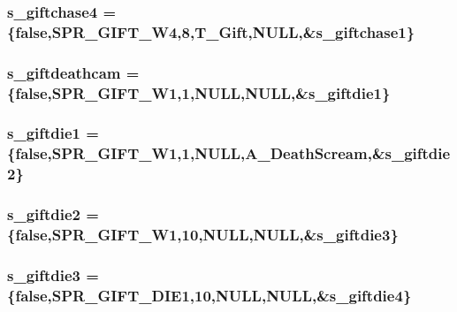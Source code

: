 \label{WL__ACT2_8C_a2c1c030f2327b8a06f1da9513739b7b2}
\hypertarget{WL__ACT2_8C_ab24a297fe8e99ef2d421c59406791af7}{
\subsubsection[{s\_\-giftchase4}]{ {\bf s\_\-giftchase4} = \{false,SPR\_\-GIFT\_\-W4,8,T\_\-Gift,NULL,\&{\bf s\_\-giftchase1}\}}}
\label{WL__ACT2_8C_ab24a297fe8e99ef2d421c59406791af7}
\hypertarget{WL__ACT2_8C_a5d7b6e22195ea183c784aaea1ccee2b3}{
\subsubsection[{s\_\-giftdeathcam}]{ {\bf s\_\-giftdeathcam} = \{false,SPR\_\-GIFT\_\-W1,1,NULL,NULL,\&{\bf s\_\-giftdie1}\}}}
\label{WL__ACT2_8C_a5d7b6e22195ea183c784aaea1ccee2b3}
\hypertarget{WL__ACT2_8C_a8ade14a52fd1d56ac5956d318e3d7261}{
\subsubsection[{s\_\-giftdie1}]{ {\bf s\_\-giftdie1} = \{false,SPR\_\-GIFT\_\-W1,1,NULL,A\_\-DeathScream,\&{\bf s\_\-giftdie2}\}}}
\label{WL__ACT2_8C_a8ade14a52fd1d56ac5956d318e3d7261}
\hypertarget{WL__ACT2_8C_a34d251ff8e929298fe05a6d85eaf6bd6}{
\subsubsection[{s\_\-giftdie2}]{ {\bf s\_\-giftdie2} = \{false,SPR\_\-GIFT\_\-W1,10,NULL,NULL,\&{\bf s\_\-giftdie3}\}}}
\label{WL__ACT2_8C_a34d251ff8e929298fe05a6d85eaf6bd6}
\hypertarget{WL__ACT2_8C_a91242714b9b95d199688bfcd64cc28a0}{
\subsubsection[{s\_\-giftdie3}]{ {\bf s\_\-giftdie3} = \{false,SPR\_\-GIFT\_\-DIE1,10,NULL,NULL,\&{\bf s\_\-giftdie4}\}}}
